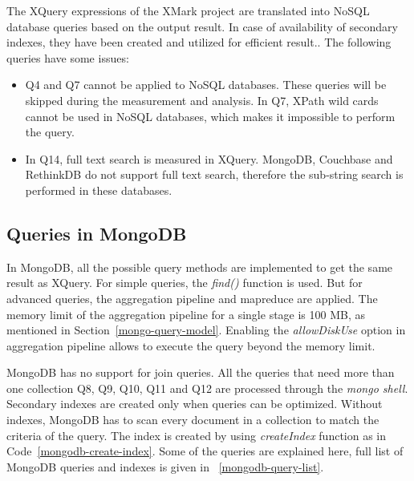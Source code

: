 The XQuery expressions of the XMark project are translated into NoSQL database queries based on the output result. In case of availability of secondary indexes, they have been created and utilized for efficient result..
 The following queries have some issues:
\begin{itemize}
\item Q4 and Q7 cannot be applied to NoSQL databases. These queries will be skipped during the measurement and analysis. In Q7, XPath  wild cards cannot be used in NoSQL databases, which makes it impossible to perform the query. 

\item In Q14, full text search is measured in XQuery. MongoDB, Couchbase and RethinkDB do not support full text search, therefore the sub-string search is performed in these databases. 
\end{itemize}

\subsection{Queries in MongoDB}

In MongoDB, all the possible query methods are implemented to get the same result as XQuery. For simple queries, the \textit{find()} function is used. But for advanced queries, the aggregation pipeline and mapreduce are applied. The memory limit of the aggregation pipeline for a single stage is 100 MB, as mentioned in Section~\ref{mongo-query-model}. Enabling the \textit{allowDiskUse} option in aggregation pipeline allows to execute the query beyond the memory limit.

MongoDB has no support for join queries. All the queries that need more than one collection  Q8, Q9, Q10, Q11 and Q12  are processed through the \textit{mongo shell}. Secondary indexes are created only when queries can be optimized. Without indexes, MongoDB has to scan every document in a collection to match the criteria of the query. The index is created by using \textit{createIndex} function as in Code~\ref{mongodb-create-index}. Some of the queries are explained here, full list of MongoDB queries and indexes is given in ~\ref{mongodb-query-list}.

